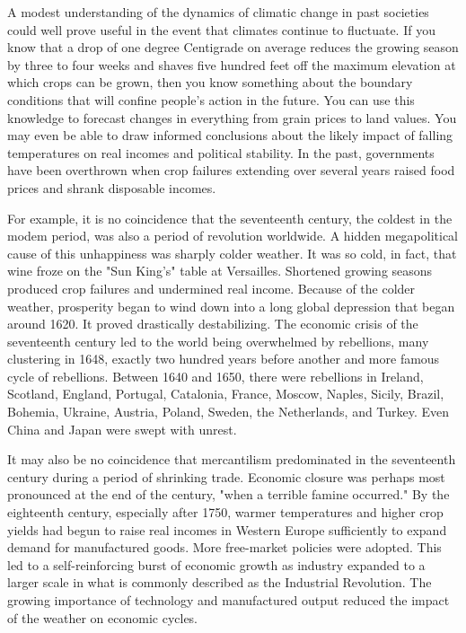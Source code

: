 \begin{paracol}{2}
A modest understanding of the dynamics of climatic change in past societies could well prove useful in the event that climates continue to fluctuate. If you know that a drop of one degree Centigrade on average reduces the growing season by three to four weeks and shaves five hundred feet off the maximum elevation at which crops can be grown, then you know something about the boundary conditions that will confine people's action in the future. You can use this knowledge to forecast changes in everything from grain prices to land values. You may even be able to draw informed conclusions about the likely impact of falling temperatures on real incomes and political stability. In the past, governments have been overthrown when crop failures extending over several years raised food prices and shrank disposable incomes.

For example, it is no coincidence that the seventeenth century, the coldest in the modem period, was also a period of revolution worldwide. A hidden megapolitical cause of this unhappiness was sharply colder weather. It was so cold, in fact, that wine froze on the "Sun King's" table at Versailles. Shortened growing seasons produced crop failures and undermined real income. Because of the colder weather, prosperity began to wind down into a long global depression that began around 1620. It proved drastically destabilizing. The economic crisis of the seventeenth century led to the world being overwhelmed by rebellions, many clustering in 1648, exactly two hundred years before another and more famous cycle of rebellions. Between 1640 and 1650, there were rebellions in Ireland, Scotland, England, Portugal, Catalonia, France, Moscow, Naples, Sicily, Brazil, Bohemia, Ukraine, Austria, Poland, Sweden, the Netherlands, and Turkey. Even China and Japan were swept with unrest.

It may also be no coincidence that mercantilism predominated in the seventeenth century during a period of shrinking trade. Economic closure was perhaps most pronounced at the end of the century, "when a terrible famine occurred." By the eighteenth century, especially after 1750, warmer temperatures and higher crop yields had begun to raise real incomes in Western Europe sufficiently to expand demand for manufactured goods. More free-market policies were adopted. This led to a self-reinforcing burst of economic growth as industry expanded to a larger scale in what is commonly described as the Industrial Revolution. The growing importance of technology and manufactured output reduced the impact of the weather on economic cycles.


\end{paracol}
